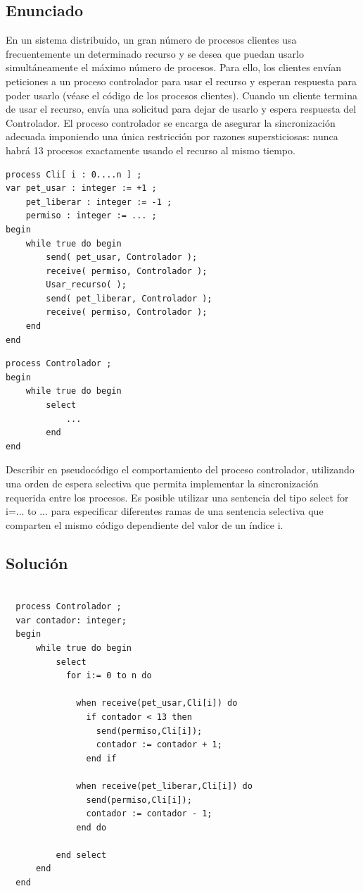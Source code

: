 \documentclass[a4paper,12pt]{article}
\begin{document}
\subsection{Enunciado}

En un sistema distribuido, un gran número de procesos clientes usa frecuentemente un determinado recurso y se desea que puedan usarlo simultáneamente el máximo número de procesos. Para ello, los clientes envían peticiones a un proceso controlador para usar el recurso y esperan respuesta para poder usarlo (véase el código de los procesos clientes). Cuando un cliente termina de usar el recurso, envía una solicitud para dejar de usarlo y espera respuesta del Controlador. El proceso controlador se encarga de asegurar la sincronización adecuada imponiendo una única restricción por razones supersticiosas: nunca habrá 13 procesos exactamente usando el recurso al mismo tiempo.

\begin{lstlisting}[style=customcpp]
process Cli[ i : 0....n ] ;
var pet_usar : integer := +1 ;
    pet_liberar : integer := -1 ;
    permiso : integer := ... ;
begin
    while true do begin
        send( pet_usar, Controlador );
        receive( permiso, Controlador );
        Usar_recurso( );
        send( pet_liberar, Controlador );
        receive( permiso, Controlador );
    end
end
\end{lstlisting}

\begin{lstlisting}[style=customcpp]
process Controlador ;
begin
    while true do begin
        select
            ...
        end
end
\end{lstlisting}

Describir en pseudocódigo el comportamiento del proceso controlador, utilizando una orden de espera selectiva que permita implementar la sincronización requerida entre los procesos. Es posible utilizar una sentencia del tipo select for i=... to ... para especificar diferentes ramas de una sentencia selectiva que comparten el mismo código dependiente del valor de un índice i.

\newpage
\subsection{Solución}

\begin{lstlisting}[style=customcpp]
  
  process Controlador ;
  var contador: integer;
  begin
      while true do begin
          select
            for i:= 0 to n do 

              when receive(pet_usar,Cli[i]) do 
                if contador < 13 then 
                  send(permiso,Cli[i]);
                  contador := contador + 1;
                end if

              when receive(pet_liberar,Cli[i]) do 
                send(permiso,Cli[i]);
                contador := contador - 1;
              end do
          
          end select
      end 
  end

\end{lstlisting}
\end{document}
